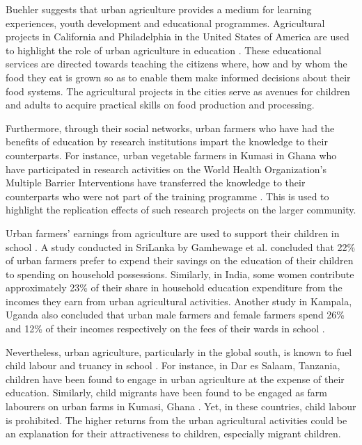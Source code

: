 Buehler \cite{Buehler2016} suggests that urban agriculture provides a medium for learning experiences, youth development and educational programmes. Agricultural projects in California and Philadelphia in the United States of America are used to highlight the role of urban agriculture in education \cite{Bradley2014}. These educational services are directed towards teaching the citizens where, how and by whom the food they eat is grown so as to enable them make informed decisions about their food systems. The agricultural projects in the cities serve as avenues for children and adults to acquire practical skills on food production and processing.

Furthermore, through their social networks, urban farmers who have had the benefits of education by research institutions impart the knowledge to their counterparts. For instance, urban vegetable farmers in Kumasi in Ghana who have participated in research activities on the World Health Organization's Multiple Barrier Interventions have transferred the knowledge to their counterparts who were not part of the training programme \cite{Amponsah2015, Amponsah2016}. This is used to highlight the replication effects of such research projects on the larger community.

Urban farmers' earnings from agriculture are used to support their children in school \cite{Prain2010}. A study conducted in SriLanka by Gamhewage et al. \cite{Gamhewage2015} concluded that 22\% of urban farmers prefer to expend their savings on the education of their children to spending on household possessions. Similarly, in India, some women contribute approximately 23\% of their share in household education expenditure from the incomes they earn from urban agricultural activities. Another study in Kampala, Uganda also concluded that urban male farmers and female farmers spend 26\% and 12\% of their incomes respectively on the fees of their wards in school \cite{Buechler2005}.

Nevertheless, urban agriculture, particularly in the global south, is known to fuel child labour and truancy in school \cite{Edet2013, InternationalLabourOrganization2006}. For instance, in Dar es Salaam, Tanzania, children have been found to engage in urban agriculture at the expense of their education. Similarly, child migrants have been found to be engaged as farm labourers on urban farms in Kumasi, Ghana \cite{Amponsah2016a}. Yet, in these countries, child labour is prohibited. The higher returns from the urban agricultural activities could be an explanation for their attractiveness to children, especially migrant children.

